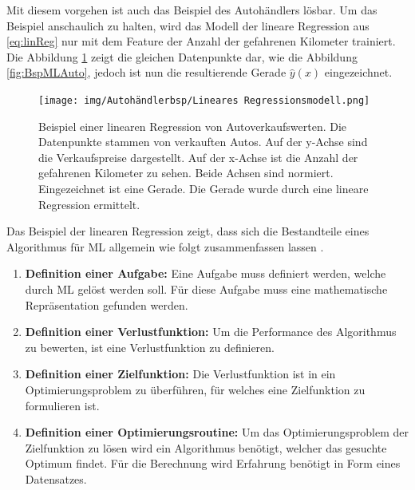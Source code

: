 Mit diesem vorgehen ist auch das Beispiel des Autohändlers lösbar. Um das Beispiel anschaulich zu halten, wird das Modell der lineare Regression aus \ref{eq:linReg} nur mit dem \gls{Feature} der Anzahl der gefahrenen Kilometer trainiert. Die Abbildung \ref{fig:BspMLAutoMitReg} zeigt die gleichen Datenpunkte dar, wie die Abbildung \ref{fig:BspMLAuto}, jedoch ist nun die resultierende Gerade \(\hat{y}(x)\) eingezeichnet. 

\begin{figure}[htb]
    \centering
    \texttt{[image: img/Autohändlerbsp/Lineares Regressionsmodell.png]}
    \caption[Beispiel einer linearen Regression von Autoverkaufswerten.]{Beispiel einer linearen Regression von Autoverkaufswerten. Die Datenpunkte stammen von verkauften Autos. Auf der y-Achse sind die Verkaufspreise dargestellt. Auf der x-Achse ist die Anzahl der gefahrenen Kilometer zu sehen. Beide Achsen sind normiert. Eingezeichnet ist eine Gerade. Die Gerade wurde durch eine lineare Regression ermittelt.}
    \label{fig:BspMLAutoMitReg}
\end{figure}

Das Beispiel der linearen Regression zeigt, dass sich die Bestandteile eines Algorithmus für \gls{ML} allgemein wie folgt zusammenfassen lassen \cite{Burkov.2019, Mitchell.1997, Goodfellow.2016}.

\begin{enumerate}
    \item \textbf{Definition einer Aufgabe:} Eine Aufgabe muss definiert werden, welche durch \gls{ML} gelöst werden soll. Für diese Aufgabe muss eine mathematische Repräsentation gefunden werden.
    \item \textbf{Definition einer \gls{Verlustfunktion}:} Um die Performance des Algorithmus zu bewerten, ist eine \gls{Verlustfunktion} zu definieren.
    \item \textbf{Definition einer \gls{Zielfunktion}:} Die \gls{Verlustfunktion} ist in ein Optimierungsproblem zu überführen, für welches eine \gls{Zielfunktion} zu formulieren ist.
    \item \textbf{Definition einer Optimierungsroutine:} Um das Optimierungsproblem der \gls{Zielfunktion} zu lösen wird ein Algorithmus benötigt, welcher das gesuchte Optimum findet. Für die Berechnung wird Erfahrung benötigt in Form eines Datensatzes.
\end{enumerate}



